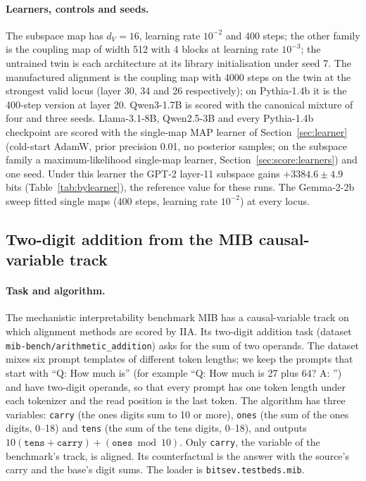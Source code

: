 \documentclass[11pt,a4paper]{article}
\newcommand{\dv}{d_V}
\begin{document}
\paragraph{Learners, controls and seeds.} The subspace map has $\dv=16$, learning rate $10^{-2}$ and 400 steps; the other family is the coupling map of width 512 with 4 blocks at learning rate $10^{-3}$; the untrained twin is each architecture at its library initialisation under seed 7. The manufactured alignment is the coupling map with 4000 steps on the twin at the strongest valid locus (layer 30, 34 and 26 respectively); on Pythia-1.4b it is the 400-step version at layer 20. Qwen3-1.7B is scored with the canonical mixture of four and three seeds. Llama-3.1-8B, Qwen2.5-3B and every Pythia-1.4b checkpoint are scored with the single-map MAP learner of Section~\ref{sec:learner} (cold-start AdamW, prior precision 0.01, no posterior samples; on the subspace family a maximum-likelihood single-map learner, Section~\ref{sec:score:learners}) and one seed. Under this learner the GPT-2 layer-11 subspace gains $+3384.6\pm4.9$ bits (Table~\ref{tab:bylearner}), the reference value for these runs. The Gemma-2-2b sweep fitted single maps (400 steps, learning rate $10^{-2}$) at every locus.

\subsection{Two-digit addition from the MIB causal-variable track}
\label{sec:tb:mib}

\paragraph{Task and algorithm.} The mechanistic interpretability benchmark MIB \cite{mib2025} has a causal-variable track on which alignment methods are scored by IIA. Its two-digit addition task (dataset \texttt{mib-bench/arithmetic\_addition}) asks for the sum of two operands. The dataset mixes six prompt templates of different token lengths; we keep the prompts that start with ``Q: How much is'' (for example ``Q: How much is 27 plus 64? A: '') and have two-digit operands, so that every prompt has one token length under each tokenizer and the read position is the last token. The algorithm has three variables: \texttt{carry} (the ones digits sum to 10 or more), \texttt{ones} (the sum of the ones digits, 0--18) and \texttt{tens} (the sum of the tens digits, 0--18), and outputs $10(\texttt{tens}+\texttt{carry})+(\texttt{ones}\bmod 10)$. Only \texttt{carry}, the variable of the benchmark's track, is aligned. Its counterfactual is the answer with the source's carry and the base's digit sums. The loader is \texttt{bitsev.testbeds.mib}.
\end{document}
